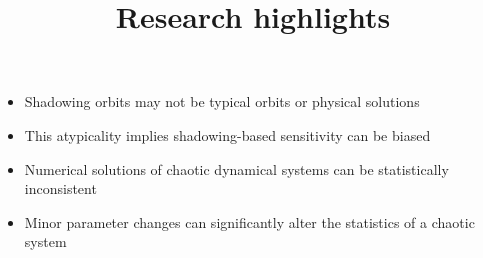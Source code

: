 \documentclass[12pt]{article}
\title{Research highlights}
\begin{document}
\maketitle
\begin{itemize}
\item Shadowing orbits may not be typical orbits or physical solutions
\item This atypicality implies shadowing-based sensitivity can be biased
\item Numerical solutions of chaotic dynamical systems can be statistically inconsistent
\item Minor parameter changes can significantly alter the statistics of a chaotic system


\end{itemize}
\end{document}
